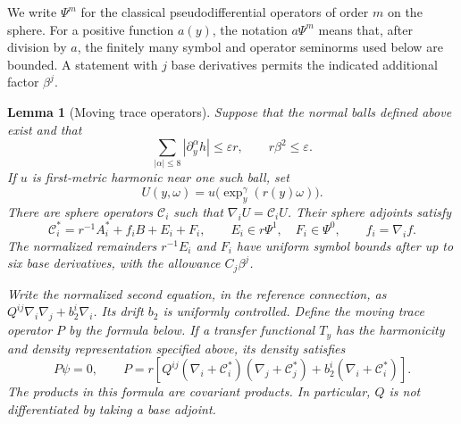 \documentclass[11pt,a4paper]{article}
\newtheorem{lemma}{Lemma}[section]
\newcommand{\eps}{\varepsilon}
\numberwithin{equation}{section}
\begin{document}
We write $\Psi^m$ for the classical pseudodifferential operators of order
$m$ on the sphere.  For a positive function $a(y)$, the notation
$a\Psi^m$ means that, after division by $a$, the finitely many symbol and
operator seminorms used below are bounded.  A statement with $j$ base
derivatives permits the indicated additional factor $\beta^j$.

\begin{lemma}[Moving trace operators]\label{angular:trace}
Suppose that the normal balls defined above exist and that
\begin{equation}\label{angular:smallness}
 \sum_{|\alpha|\le8}|\partial_y^\alpha h|\le\eps r,
 \qquad r\beta^2\le\eps.
\end{equation}
If $u$ is first-metric harmonic near one such ball, set
\[
 U(y,\omega)=u\bigl(\exp_y^\gamma(r(y)\omega)\bigr).
\]
There are sphere operators $\mathcal C_i$ such that
$\nabla_iU=\mathcal C_iU$.  Their sphere adjoints satisfy
\begin{equation}\label{angular:C-expansion}
 \mathcal C_i^*=r^{-1}A_i^*+f_iB+E_i+F_i,
 \qquad E_i\in r\Psi^1,\quad F_i\in\Psi^0,
 \qquad f_i=\nabla_i f.
\end{equation}
The normalized remainders $r^{-1}E_i$ and $F_i$ have uniform symbol
bounds after up to six base derivatives, with the allowance $C_j\beta^j$.

Write the normalized second equation, in the reference connection, as
$Q^{ij}\nabla_i\nabla_j+b_2^i\nabla_i$.  Its drift $b_2$ is uniformly
controlled.  Define the moving trace operator $P$ by the formula below. If a transfer functional $T_y$ has the harmonicity and density representation specified above, its density satisfies
\begin{equation}\label{angular:P-equation}
 P\psi=0,\qquad
 P=r\left[Q^{ij}(\nabla_i+\mathcal C_i^*)
                    (\nabla_j+\mathcal C_j^*)
             +b_2^i(\nabla_i+\mathcal C_i^*)\right].
\end{equation}
The products in this formula are covariant products.  In particular,
$Q$ is not differentiated by taking a base adjoint.
\end{lemma}
\end{document}
